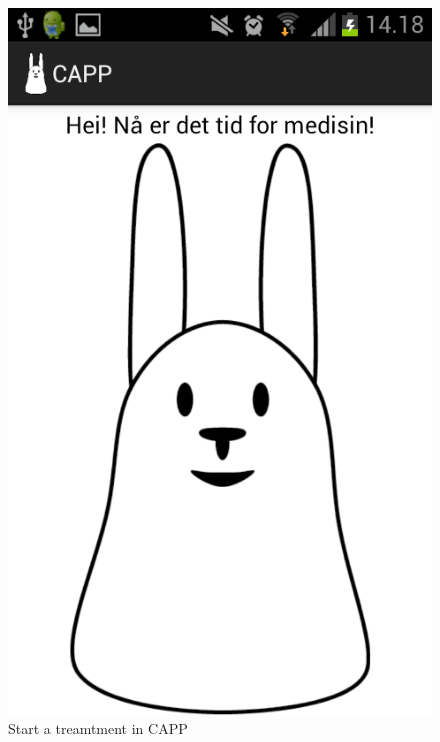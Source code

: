 \begin{figure}
\begin{minipage}[b]{0.4\linewidth}
		\includegraphics[width=0.20\paperwidth]{Pictures/Screenshots/capp_start_treatment.png}
	\caption{Start a treamtment in CAPP}
	\label{fig:capp-start-treatment}
	\end{minipage}
\end{figure}

